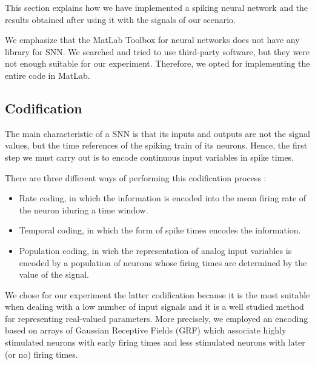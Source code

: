 \label{sec:application:snn}


This section explains how we have implemented a spiking neural network and the results obtained after using it with the signals of our scenario. 

We emphasize that the MatLab Toolbox for neural networks does not have any library for SNN. We searched and tried to use third-party software, but they were not enough suitable for our experiment. Therefore, we opted for implementing the entire code in MatLab.






\subsection{Codification}
\label{subsec:codification}
The main characteristic of a SNN is that its inputs and outputs are not the signal values, but the time references of the spiking train of its neurons. Hence, the first step we must carry out is to encode continuous input variables in spike times.

There are three different ways of performing this codification process \cite{stromatias2011developing}:
\begin{itemize}
\item Rate coding, in which the	information	is encoded into	the	mean firing rate of the neuron iduring a time window.
\item Temporal coding, in which the form of spike times encodes the information.
\item Population coding, in wich the representation of analog input variables is encoded by a population of neurons whose firing times are determined by the value of the signal.
\end{itemize}

We chose for our experiment the latter codification because it is the most suitable when dealing with a low number of input signals and it is a well studied method for representing real-valued parameters. 
More precisely, we employed an encoding based on arrays of Gaussian Receptive Fields (GRF) which associate highly stimulated neurons with early firing times and less stimulated neurons with later (or no) firing times.

